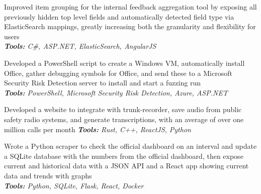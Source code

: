 \documentclass[10pt,letter]{altacv}
\begin{document}
\divider

Improved item grouping for the internal feedback aggregation tool by exposing all previously hidden top level fields and automatically detected field type via \\ ElasticSearch mappings, greatly increasing both the granularity and flexibility for users \\
\textit{\textbf{Tools:} C\#, ASP.NET, ElasticSearch, AngularJS}

Developed a PowerShell script to create a Windows VM, automatically install Office, gather debugging symbols for Office, and send these to a Microsoft Security Risk Detection server to install and start a fuzzing run \\
\textit{\textbf{Tools:} PowerShell, Microsoft Security Risk Detection, Azure, ASP.NET}

\smallskip


Developed a website to integrate with trunk-recorder, save audio from public safety radio systems, and generate transcriptions, with an average of over one million calls per month
\textit{\textbf{Tools:} Rust, C++, ReactJS, Python}

\divider

Wrote a Python scraper to check the official dashboard on an interval and update a SQLite database with the numbers from the official dashboard, then expose current and historical data with a JSON API and a React app showing current data and trends with graphs \\
\textit{\textbf{Tools:} Python, SQLite, Flask, React, Docker}


\end{document}
